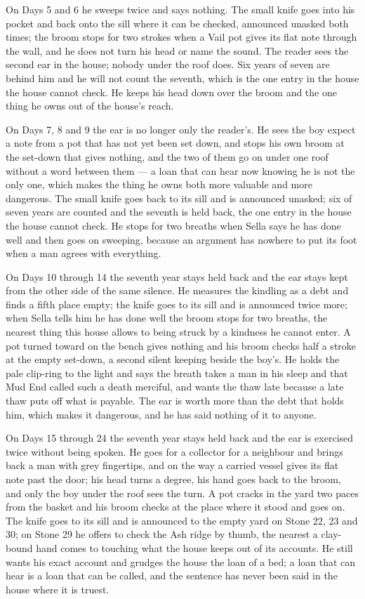 \documentclass{design/chronicle}
\begin{document}
{On Days 5 and 6 he sweeps twice and says nothing. The small knife goes into his pocket and back onto the sill where it can be checked, announced unasked both times; the broom stops for two strokes when a Vail pot gives its flat note through the wall, and he does not turn his head or name the sound. The reader sees the second ear in the house; nobody under the roof does. Six years of seven are behind him and he will not count the seventh, which is the one entry in the house the house cannot check. He keeps his head down over the broom and the one thing he owns out of the house’s reach.

On Days 7, 8 and 9 the ear is no longer only the reader’s. He sees the boy expect a note from a pot that has not yet been set down, and stops his own broom at the set-down that gives nothing, and the two of them go on under one roof without a word between them --- a loan that can hear now knowing he is not the only one, which makes the thing he owns both more valuable and more dangerous. The small knife goes back to its sill and is announced unasked; six of seven years are counted and the seventh is held back, the one entry in the house the house cannot check. He stops for two breaths when Sella says he has done well and then goes on sweeping, because an argument has nowhere to put its foot when a man agrees with everything.

On Days 10 through 14 the seventh year stays held back and the ear stays kept from the other side of the same silence. He measures the kindling as a debt and finds a fifth place empty; the knife goes to its sill and is announced twice more; when Sella tells him he has done well the broom stops for two breaths, the nearest thing this house allows to being struck by a kindness he cannot enter. A pot turned toward on the bench gives nothing and his broom checks half a stroke at the empty set-down, a second silent keeping beside the boy’s. He holds the pale clip-ring to the light and says the breath takes a man in his sleep and that Mud End called such a death merciful, and wants the thaw late because a late thaw puts off what is payable. The ear is worth more than the debt that holds him, which makes it dangerous, and he has said nothing of it to anyone.

On Days 15 through 24 the seventh year stays held back and the ear is exercised twice without being spoken. He goes for a collector for a neighbour and brings back a man with grey fingertips, and on the way a carried vessel gives its flat note past the door; his head turns a degree, his hand goes back to the broom, and only the boy under the roof sees the turn. A pot cracks in the yard two paces from the basket and his broom checks at the place where it stood and goes on. The knife goes to its sill and is announced to the empty yard on Stone 22, 23 and 30; on Stone 29 he offers to check the Ash ridge by thumb, the nearest a clay-bound hand comes to touching what the house keeps out of its accounts. He still wants his exact account and grudges the house the loan of a bed; a loan that can hear is a loan that can be called, and the sentence has never been said in the house where it is truest.

}
\end{document}
